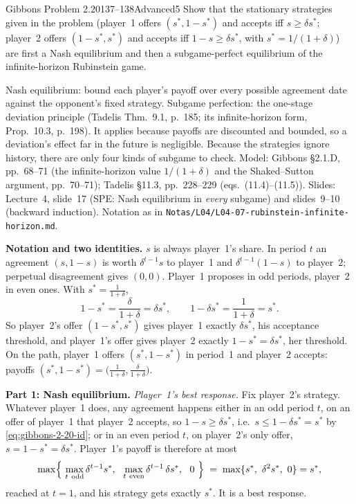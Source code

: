 \begin{exsol}{Gibbons Problem 2.20}{137--138}{Advanced}{5}
\asked Show that the stationary strategies given in the problem (player~1 offers $(s^*, 1-s^*)$ and
accepts iff $s \ge \delta s^*$; player~2 offers $(1-s^*, s^*)$ and accepts iff $1-s \ge \delta s^*$,
with $s^* = 1/(1+\delta)$) are first a Nash equilibrium and then a subgame-perfect equilibrium of the
infinite-horizon Rubinstein game.

\method Nash equilibrium: bound each player's payoff over every possible agreement date against
the opponent's fixed strategy. Subgame perfection: the one-stage deviation principle (Tadelis
Thm.~9.1, p.~185; its infinite-horizon form, Prop.~10.3, p.~198). It applies because payoffs are
discounted and bounded, so a deviation's effect far in the future is negligible. Because the
strategies ignore history, there are only four kinds of subgame to check. Model: Gibbons
\S2.1.D, pp.~68--71 (the infinite-horizon value $1/(1+\delta)$ and the Shaked--Sutton argument,
pp.~70--71); Tadelis \S11.3, pp.~228--229 (eqs.~(11.4)--(11.5)). Slides: Lecture~4, slide~17 (SPE:
Nash equilibrium in \emph{every} subgame) and slides~9--10 (backward induction). Notation as in
\texttt{Notas/L04/L04-07-rubinstein-infinite-horizon.md}.

\solution
\textbf{Notation and two identities.} $s$ is always player~1's share. In period $t$ an agreement
$(s, 1-s)$ is worth $\delta^{t-1}s$ to player~1 and $\delta^{t-1}(1-s)$ to player~2; perpetual
disagreement gives $(0,0)$. Player~1 proposes in odd periods, player~2 in even ones. With
$s^* = \frac1{1+\delta}$,
\begin{equation}
  1 - s^* = \frac{\delta}{1+\delta} = \delta s^*, \qquad 1 - \delta s^* = \frac{1}{1+\delta} = s^* .
  \label{eq:gibbons-2-20-id}
\end{equation}
So player~2's offer $(1-s^*, s^*)$ gives player~1 exactly $\delta s^*$, his acceptance threshold, and
player~1's offer gives player~2 exactly $1 - s^* = \delta s^*$, her threshold. On the path, player~1
offers $(s^*, 1-s^*)$ in period~1 and player~2 accepts: payoffs $(s^*, 1-s^*) =
\bigl(\frac1{1+\delta}, \frac\delta{1+\delta}\bigr)$.

\textbf{Part 1: Nash equilibrium.}
\emph{Player~1's best response.} Fix player~2's strategy. Whatever player~1 does, any agreement
happens either in an odd period $t$, on an offer of player~1 that player~2 accepts, so
$1 - s \ge \delta s^*$, i.e.\ $s \le 1 - \delta s^* = s^*$ by \eqref{eq:gibbons-2-20-id}; or in an even
period $t$, on player~2's only offer, $s = 1 - s^* = \delta s^*$. Player~1's payoff is therefore at most
\[
  \max\Bigl\{\ \max_{t\ \text{odd}} \delta^{t-1}s^*,\ \ \max_{t\ \text{even}} \delta^{t-1}\,\delta s^*,\
  \ 0\ \Bigr\} \;=\; \max\{s^*,\ \delta^2 s^*,\ 0\} = s^* ,
\]
reached at $t=1$, and his strategy gets exactly $s^*$. It is a best response.


\end{exsol}
